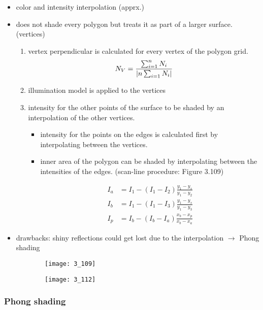\documentclass{standalone}
\begin{document}
\begin{itemize}
	\item color and intensity interpolation (apprx.)
	\item does not shade every polygon but treats it as part of a larger surface. (vertices)
	\begin{enumerate}
		\item vertex perpendicular is calculated for every vertex of the polygon grid.
			\begin{equation}
				N_V = \frac{\sum_{i=1}^n N_i}{\abs{n \sum_{i=1} N_i}}
			\end{equation}
		\item illumination model is applied to the vertices 
		\item intensity for the other points of the surface to be shaded by an interpolation of the other vertices.
			\begin{itemize}
				\item intensity for the points on the edges is calculated first by interpolating between the vertices. 
				\item inner area of the polygon can be shaded by interpolating between the intensities of the edges. (scan-line procedure: Figure 3.109)
				
				\begin{align}
					I_a &= I_1 - (I_1 - I_2) \frac{y_1 - y_s}{y_1 - y_2} \\
					I_b &= I_1 - (I_1 - I_3) \frac{y_1 - y_s}{y_1 - y_3} \\
					I_p &= I_b - (I_b - I_a) \frac{x_b - x_p}{x_b - x_a}
				\end{align}
				
			\end{itemize}
	\end{enumerate}
	\item drawbacks: shiny reflections could get lost due to the interpolation $\rightarrow$ Phong shading
\end{itemize}

\begin{figure}[H]
	\begin{subfigure}[b]{0.45\textwidth}
		\texttt{[image: 3\_109]}
	\end{subfigure}
	\begin{subfigure}[b]{0.45\textwidth}
		\texttt{[image: 3\_112]}
	\end{subfigure}
\end{figure}

\subsubsection*{Phong shading}
\end{document}
